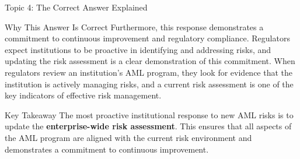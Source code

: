 \documentclass[8pt]{beamer}  %
\begin{document}
\begin{frame}{Topic 4: The Correct Answer Explained}
\begin{block}{\large Why This Answer Is Correct}
			Furthermore, this response demonstrates a commitment to continuous improvement and regulatory compliance. Regulators expect institutions to be proactive in identifying and addressing risks, and updating the risk assessment is a clear demonstration of this commitment. When regulators review an institution's AML program, they look for evidence that the institution is actively managing risks, and a current risk assessment is one of the key indicators of effective risk management.
		\end{block}
		
		\begin{alertblock}{Key Takeaway}
			The most proactive institutional response to new AML risks is to update the \textbf{enterprise-wide risk assessment}. This ensures that all aspects of the AML program are aligned with the current risk environment and demonstrates a commitment to continuous improvement.
		\end{alertblock}
	\end{frame}
	
\end{document}
